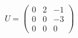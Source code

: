 \documentclass[preview]{standalone}
\begin{document}
\begin{align*}
U = \begin{pmatrix} 0 & 2 & -1 \\ 0 & 0 & -3 \\ 0 & 0 & 0 \end{pmatrix}
\end{align*}
\end{document}
